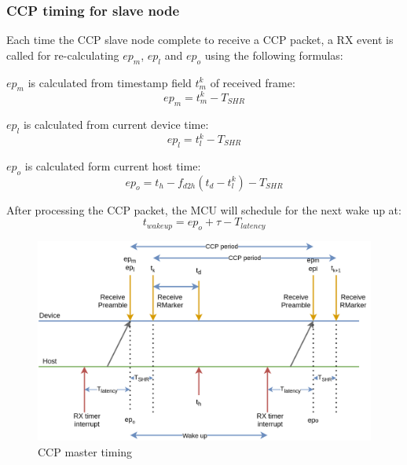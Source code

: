 \documentclass[\main/main.tex]{subfiles}
\begin{document}
\subsubsection{CCP timing for slave node}

Each time the CCP slave node complete to receive a CCP packet, a RX event is called for re-calculating $ep_m$, $ep_l$ and $ep_o$ using the following formulas:

$ep_m$ is calculated from timestamp field $t^k_m$ of received frame:
\begin{equation}
    ep_m = t^k_m - T_{SHR}
\end{equation}

$ep_l$ is calculated from current device time:
\begin{equation}
ep_l = t^k_l - T_{SHR}
\end{equation}

$ep_o$ is calculated form current host time:
\begin{equation}
    ep_o = t_h - f_{d2h}(t_d - t^k_l) - T_{SHR}
\end{equation}

After processing the CCP packet, the MCU will schedule for the next wake up at:
\begin{equation}
    t_{wake up} = ep_o + \tau - T_{latency}
\end{equation}

\begin{figure}[H]
    \begin{center}
        \includegraphics[width=1\textwidth]{ccp_timing_for_slave_node.png}
    \end{center}
    \caption{CCP master timing}
    \label{fig:ccp_timing_for_slave_node}
\end{figure}
\end{document}
